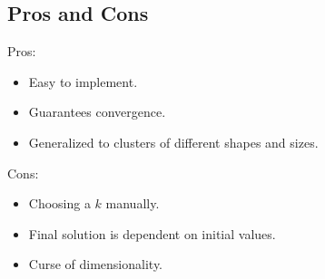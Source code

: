 \documentclass[
	number={6},
	title={Clustering}
]{cs584notes}
\begin{document}
\subsection{Pros and Cons}\label{subsec:k-means-pros-and-cons}
Pros:
\begin{itemize}
	\item Easy to implement.
	\item Guarantees convergence.
	\item Generalized to clusters of different shapes and sizes.
\end{itemize}
Cons:
\begin{itemize}
	\item Choosing a $k$ manually.
	\item Final solution is dependent on initial values.
	\item Curse of dimensionality.
\end{itemize}
\end{document}
